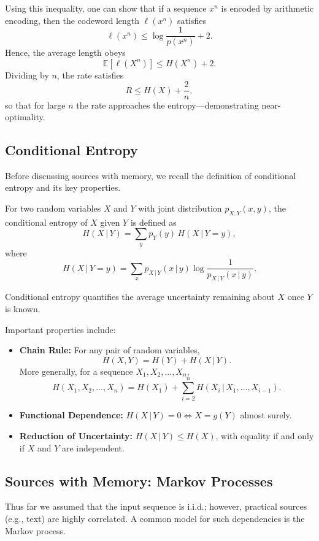 Using this inequality, one can show that if a sequence \(x^n\) is encoded by arithmetic encoding, then the codeword length \(\ell(x^n)\) satisfies
\[
\ell(x^n) \le \log \frac{1}{p(x^n)} + 2.
\]
Hence, the average length obeys
\[
\mathbb{E}[\ell(X^n)] \le H(X^n) + 2.
\]
Dividing by \(n\), the rate satisfies
\[
R \le H(X) + \frac{2}{n},
\]
so that for large \(n\) the rate approaches the entropy—demonstrating near-optimality.

\subsection{Conditional Entropy}
Before discussing sources with memory, we recall the definition of conditional entropy and its key properties.

\begin{definition}
For two random variables \(X\) and \(Y\) with joint distribution \(p_{X,Y}(x,y)\), the conditional entropy of \(X\) given \(Y\) is defined as
\[
H(X \,|\, Y) = \sum_{y} p_Y(y) \, H(X \,|\, Y=y),
\]
where
\[
H(X \,|\, Y=y) = \sum_{x} p_{X\,|\, Y}(x \,|\, y) \log \frac{1}{p_{X\,|\, Y}(x \,|\, y)}.
\]
\end{definition}

\begin{remark}
Conditional entropy quantifies the average uncertainty remaining about \(X\) once \(Y\) is known.
\end{remark}

Important properties include:
\begin{itemize}
    \item \textbf{Chain Rule:} For any pair of random variables,
    \[
    H(X,Y) = H(Y) + H(X \,|\, Y).
    \]
    More generally, for a sequence \(X_1, X_2, \ldots, X_n\),
    \[
    H(X_1, X_2, \ldots, X_n) = H(X_1) + \sum_{i=2}^{n} H(X_i \,|\, X_1, \ldots, X_{i-1}).
    \]
    \item \textbf{Functional Dependence:} \(H(X \,|\, Y) = 0 \iff X=g(Y)\) almost surely.
    \item \textbf{Reduction of Uncertainty:} \(H(X \,|\, Y) \le H(X)\), with equality if and only if \(X\) and \(Y\) are independent.
\end{itemize}

\subsection{Sources with Memory: Markov Processes}

Thus far we assumed that the input sequence is i.i.d.; however, practical sources (e.g., text) are highly correlated. A common model for such dependencies is the Markov process.

